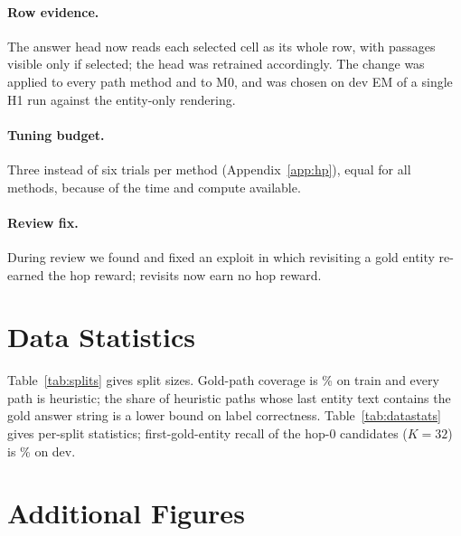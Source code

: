 \paragraph{Row evidence.}
The answer head now reads each selected cell as its whole row, with passages visible only if selected; the head was retrained accordingly.
The change was applied to every path method and to M0, and was chosen on dev EM of a single H1 run against the entity-only rendering.
\paragraph{Tuning budget.}
Three instead of six trials per method (Appendix~\ref{app:hp}), equal for all methods, because of the time and compute available.
\paragraph{Review fix.}
During review we found and fixed an exploit in which revisiting a gold entity re-earned the hop reward; revisits now earn no hop reward.

\section{Data Statistics}
\label{app:data}

Table~\ref{tab:splits} gives split sizes.
Gold-path coverage is \GoldCovTrain\% on train and every path is heuristic; the share of heuristic paths whose last entity text contains the gold answer string is a lower bound on label correctness.
Table~\ref{tab:datastats} gives per-split statistics; first-gold-entity recall of the hop-0 candidates ($K=32$) is \RecallKDev\% on dev.
\begin{table}[t]
\centering\small
\resizebox{\columnwidth}{!}{}
\caption{Per-split statistics: questions, distinct tables, share with a heuristic gold path, mean gold-path length, passage answers, mean rows and columns.}
\label{tab:datastats}
\end{table}

\section{Additional Figures}
\label{app:figs}

